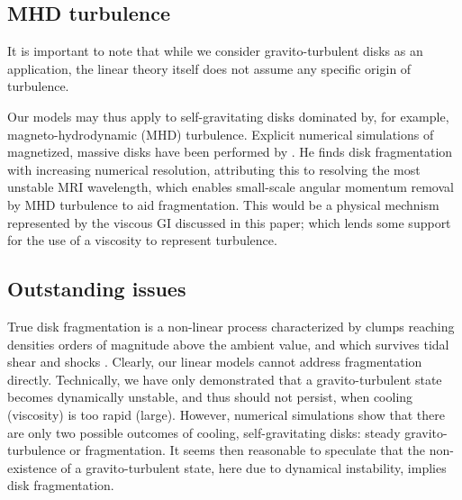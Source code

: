\subsection{MHD turbulence}%
It is important to note that while we consider gravito-turbulent disks  
as an application, the linear theory itself does not assume any 
specific origin of turbulence. 

Our models may thus apply to self-gravitating disks dominated by, for
example, magneto-hydrodynamic (MHD) turbulence.   
Explicit numerical simulations of magnetized, massive disks have been performed 
by \cite{fromang05}. He finds disk fragmentation with increasing numerical
resolution, attributing this to resolving the most unstable MRI
wavelength, which enables small-scale angular momentum removal by MHD
turbulence to aid fragmentation. %
This would be a physical mechnism represented by the viscous GI
discussed in this paper; which lends some support for  
the use of a viscosity to represent turbulence.    


\subsection{Outstanding issues}
True disk fragmentation is a non-linear process characterized by clumps   
reaching densities orders of magnitude above the ambient value, and
which survives tidal shear and shocks \citep{paardekooper12,young16}.  
Clearly, our linear models cannot address fragmentation
directly. Technically, we have only demonstrated that a 
gravito-turbulent state becomes dynamically unstable, and thus should
not persist, when cooling (viscosity) is too rapid (large).  
However, numerical simulations show that there are only two
possible outcomes of cooling, self-gravitating disks: steady
gravito-turbulence or fragmentation. It seems then reasonable to 
speculate that the non-existence of a gravito-turbulent state, here due to
dynamical instability, implies disk fragmentation.  

